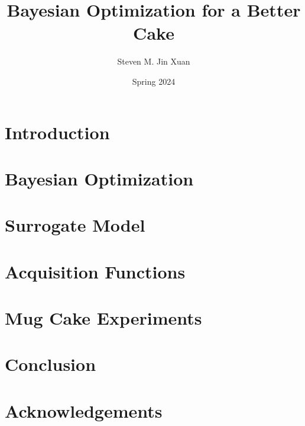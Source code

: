 \documentclass[letterpaper]{article}
\author{Steven M. Jin Xuan}
\date{Spring 2024}
\title{Bayesian Optimization for a Better Cake}
\begin{document}
\maketitle
\pagebreak



\section{Introduction}\label{sec:intro}


\section{Bayesian Optimization}\label{sec:bo}


\section{Surrogate Model}\label{sec:sm}




\section{Acquisition Functions}\label{sec:af}


\section{Mug Cake Experiments}\label{sec:exp}


\section{Conclusion}\label{sec:conclusion}


\section*{Acknowledgements}


\pagebreak

{}

\end{document}
